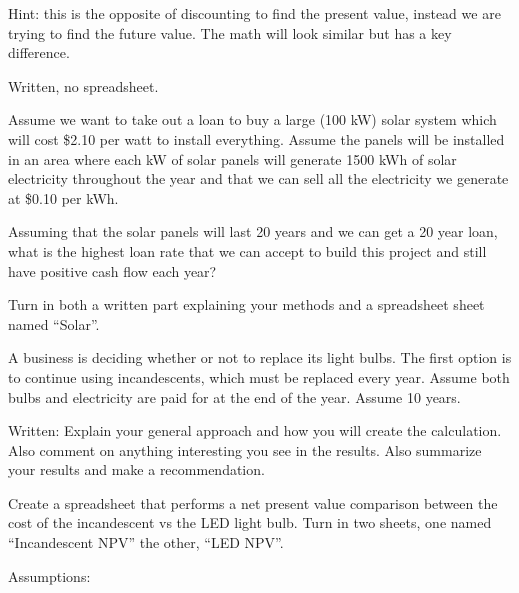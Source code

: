 \documentclass{article}
\begin{document}
Hint: this is the opposite of discounting to find the present value,
instead we are trying to find the future value.  The math will look
similar but has a key difference.

Written, no spreadsheet.

Assume we want to take out a loan to buy a large (100 kW) solar system
which will cost \$2.10 per watt to install everything.  Assume the
panels will be installed in an area where each kW of solar panels will
generate 1500 kWh of solar electricity throughout the year and that we
can sell all the electricity we generate at \$0.10 per kWh.

Assuming that the solar panels will last 20 years and we can get a 20
year loan, what is the highest loan rate that we can accept to build
this project and still have positive cash flow each year?

Turn in both a written part explaining your methods and a spreadsheet
sheet named ``Solar''.




A business is deciding whether or not to replace its light bulbs.  The
first option is to continue using incandescents, which must be replaced
every year.  Assume both bulbs and electricity are paid for at the
end of the year.  Assume 10 years.

Written: Explain your general approach and how you will create the
calculation.  Also comment on anything interesting you see in the
results.  Also summarize your results and make a recommendation.

Create a spreadsheet that performs a net present value comparison
between the cost of the incandescent vs the LED light bulb.  Turn in two
sheets, one named ``Incandescent NPV'' the other, ``LED NPV''.

Assumptions:
\end{document}
